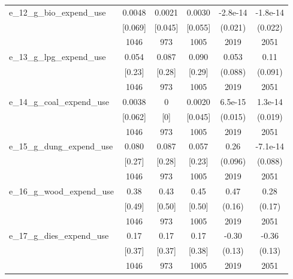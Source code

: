\begin{table}[htbp]
\begin{tabular*}{0.9\hsize}{@{\hskip\tabcolsep\extracolsep\fill}l*{1}{ccccc}}
e\_12\_g\_bio\_expend\_use           &   0.0048&   0.0021&   0.0030& -2.8e-14         & -1.8e-14         \\
                                &  [0.069]&  [0.045]&  [0.055]&  (0.021)         &  (0.022)         \\
                                &     1046&      973&     1005&     2019         &     2051         \\
e\_13\_g\_lpg\_expend\_use           &    0.054&    0.087&    0.090&    0.053         &     0.11         \\
                                &   [0.23]&   [0.28]&   [0.29]&  (0.088)         &  (0.091)         \\
                                &     1046&      973&     1005&     2019         &     2051         \\
e\_14\_g\_coal\_expend\_use          &   0.0038&        0&   0.0020&  6.5e-15         &  1.3e-14         \\
                                &  [0.062]&      [0]&  [0.045]&  (0.015)         &  (0.019)         \\
                                &     1046&      973&     1005&     2019         &     2051         \\
e\_15\_g\_dung\_expend\_use          &    0.080&    0.087&    0.057&     0.26\sym{***}& -7.1e-14         \\
                                &   [0.27]&   [0.28]&   [0.23]&  (0.096)         &  (0.088)         \\
                                &     1046&      973&     1005&     2019         &     2051         \\
e\_16\_g\_wood\_expend\_use          &     0.38&     0.43&     0.45&     0.47\sym{***}&     0.28\sym{*}  \\
                                &   [0.49]&   [0.50]&   [0.50]&   (0.16)         &   (0.17)         \\
                                &     1046&      973&     1005&     2019         &     2051         \\
e\_17\_g\_dies\_expend\_use          &     0.17&     0.17&     0.17&    -0.30\sym{**} &    -0.36\sym{***}\\
                                &   [0.37]&   [0.37]&   [0.38]&   (0.13)         &   (0.13)         \\
                                &     1046&      973&     1005&     2019         &     2051         \\

\end{tabular*}
\end{table}
